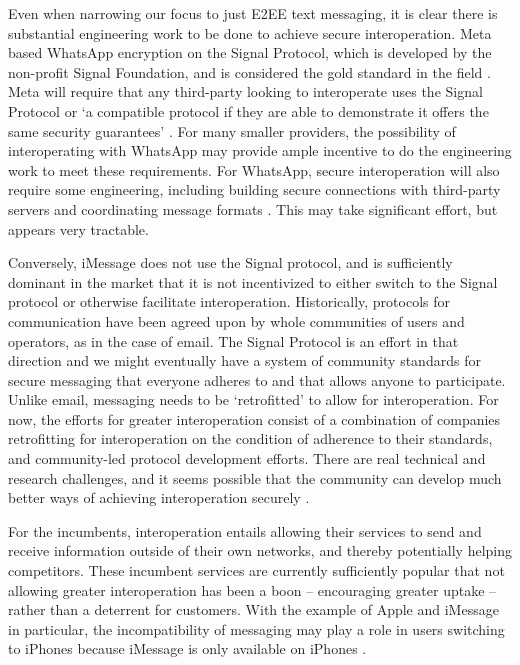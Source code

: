 \documentclass[letterpaper,twocolumn,10pt]{article}
\begin{document}
Even when narrowing our focus to just E2EE text messaging,
it is clear there is substantial engineering work to be done to achieve secure interoperation. Meta based WhatsApp encryption on the Signal Protocol, which is developed by the non-profit Signal Foundation, and is considered the gold standard in the field \cite{meta_interop}. Meta will require that any third-party looking to interoperate uses the Signal Protocol or `a compatible protocol if they are able to demonstrate it offers the same security guarantees' \cite{meta_interop}. For many smaller providers, the possibility of interoperating with WhatsApp may provide ample incentive to do the engineering work to meet these requirements. For WhatsApp, secure interoperation will also require some engineering, including building secure connections with third-party servers and coordinating
message formats
 \cite{meta_interop}. This may take significant effort, but appears very tractable.

Conversely, iMessage does not use the Signal protocol, and is sufficiently dominant in the market that it is not incentivized to either switch to the Signal protocol or otherwise facilitate interoperation. Historically, protocols for communication have been agreed upon by whole communities of users and operators, as in the case of email. The Signal Protocol is an effort in that direction and we might eventually have a system of community standards for secure messaging that everyone adheres to and that allows anyone to participate.  Unlike email, messaging needs to be `retrofitted' to allow for interoperation. For now, the efforts for greater interoperation consist of a combination of companies retrofitting for interoperation on the condition of adherence to their standards, and community-led protocol development efforts. There are real technical and research challenges, and it seems possible that the community can develop much better ways of achieving interoperation securely \cite{dma_how_to_e2ee,dma_concerns_e2ee_ross}.

For the incumbents, interoperation entails allowing their services to send and receive information outside of their own networks, and thereby potentially helping competitors.  These incumbent services are currently sufficiently popular that not allowing greater interoperation has been a boon -- encouraging greater uptake -- rather than a deterrent for customers. With the example of Apple and iMessage in particular, the incompatibility of messaging may play a role in users switching to iPhones because iMessage is only available on iPhones \cite{imessage_doj}. 
\end{document}
